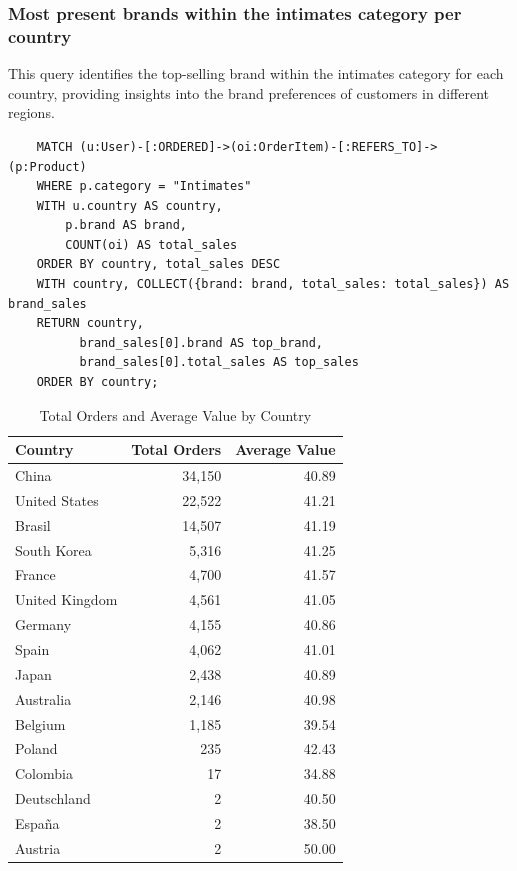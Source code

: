 \documentclass[a4paper,12pt]{article}
\begin{document}
  \subsubsection{Most present brands within the intimates category per country}
  This query identifies the top-selling brand within the intimates category for each country, providing insights into the brand preferences of customers in different regions.
  \begin{verbatim}
    MATCH (u:User)-[:ORDERED]->(oi:OrderItem)-[:REFERS_TO]->(p:Product)
    WHERE p.category = "Intimates"
    WITH u.country AS country, 
        p.brand AS brand, 
        COUNT(oi) AS total_sales
    ORDER BY country, total_sales DESC
    WITH country, COLLECT({brand: brand, total_sales: total_sales}) AS brand_sales
    RETURN country, 
          brand_sales[0].brand AS top_brand, 
          brand_sales[0].total_sales AS top_sales
    ORDER BY country;
    \end{verbatim}
    \begin{table}[h!]
      \centering
      \caption{Total Orders and Average Value by Country}
      \label{tab:orders_and_average}
      \begin{tabular}{l r r}
          \toprule
          \textbf{Country} & \textbf{Total Orders} & \textbf{Average Value} \\
          \midrule
          China           & 34,150  & 40.89 \\
          United States   & 22,522  & 41.21 \\
          Brasil          & 14,507  & 41.19 \\
          South Korea     & 5,316   & 41.25 \\
          France          & 4,700   & 41.57 \\
          United Kingdom  & 4,561   & 41.05 \\
          Germany         & 4,155   & 40.86 \\
          Spain           & 4,062   & 41.01 \\
          Japan           & 2,438   & 40.89 \\
          Australia       & 2,146   & 40.98 \\
          Belgium         & 1,185   & 39.54 \\
          Poland          & 235     & 42.43 \\
          Colombia        & 17      & 34.88 \\
          Deutschland     & 2       & 40.50 \\
          España          & 2       & 38.50 \\
          Austria         & 2       & 50.00 \\
          \bottomrule
      \end{tabular}
  \end{table}
\end{document}
